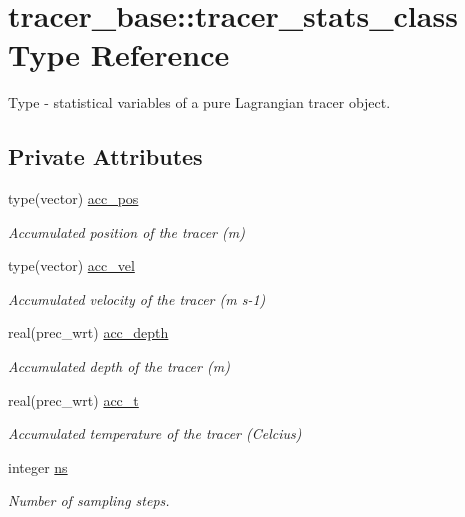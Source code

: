 \hypertarget{structtracer__base_1_1tracer__stats__class}{}\section{tracer\+\_\+base\+:\+:tracer\+\_\+stats\+\_\+class Type Reference}
\label{structtracer__base_1_1tracer__stats__class}


Type -\/ statistical variables of a pure Lagrangian tracer object.  


\subsection*{Private Attributes}
\begin{DoxyCompactItemize}
\item 
type(vector) \mbox{\hyperlink{structtracer__base_1_1tracer__stats__class_ae01f6d724c6a81e28d959571187e5949}{acc\+\_\+pos}}
\begin{DoxyCompactList}\small\item\em Accumulated position of the tracer (m) \end{DoxyCompactList}\item 
type(vector) \mbox{\hyperlink{structtracer__base_1_1tracer__stats__class_af5c29fc910469ddabe6e549a3743c310}{acc\+\_\+vel}}
\begin{DoxyCompactList}\small\item\em Accumulated velocity of the tracer (m s-\/1) \end{DoxyCompactList}\item 
real(prec\+\_\+wrt) \mbox{\hyperlink{structtracer__base_1_1tracer__stats__class_a33ecd4e2ae6ac454806fc383dbc0855a}{acc\+\_\+depth}}
\begin{DoxyCompactList}\small\item\em Accumulated depth of the tracer (m) \end{DoxyCompactList}\item 
real(prec\+\_\+wrt) \mbox{\hyperlink{structtracer__base_1_1tracer__stats__class_a32e1843f4809696a7c58d5b911d4a745}{acc\+\_\+t}}
\begin{DoxyCompactList}\small\item\em Accumulated temperature of the tracer (Celcius) \end{DoxyCompactList}\item 
integer \mbox{\hyperlink{structtracer__base_1_1tracer__stats__class_a77e72ef1bc36c7b337f2d1b199010e81}{ns}}
\begin{DoxyCompactList}\small\item\em Number of sampling steps. \end{DoxyCompactList}\end{DoxyCompactItemize}


